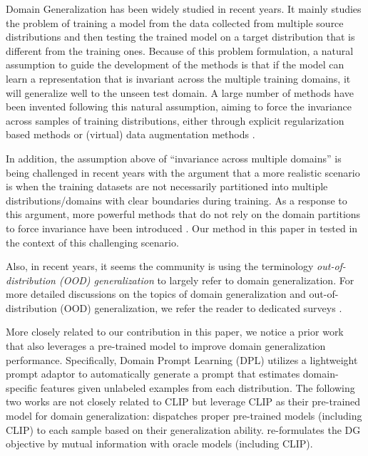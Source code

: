 \documentclass[10pt,twocolumn,letterpaper]{article}
\begin{document}
Domain Generalization \cite{muandet2013domain} has been widely studied in recent years.
It mainly studies the problem of training a model from the data collected from multiple 
source distributions and then testing the trained model 
on a target distribution that is different from the training ones. Because of this problem formulation, 
a natural assumption to guide the development of the methods 
is that
if the model can learn a representation that is invariant across the multiple 
training domains, 
it will generalize well to the unseen test domain. 
A large number of methods have been invented
following this natural assumption, 
aiming to force the invariance across samples of training distributions, 
either through explicit regularization based methods \cite{li2018domain,li2018deep,zhao2020domain,wang2016select,motiian2017unified,carlucci2018agnostic,akuzawa2019adversarial,ge2021supervised,nguyen2021domain,rahman2021discriminative,han2021learning,zhu2022localized,ding2022domain,wang2022out,wu2022siamdoge,meng2022attention,lee2022cross,zhang2022mvdg,yao2022pcl,huang2020improving,wang2022toward}
or (virtual) data augmentation methods \cite{shankar2018generalizing,yue2019domain,gong2019dlow,zhou2020deep,huang2021fsdr,wang2022domain}. 



In addition, 
the assumption above of ``invariance across multiple domains''
is being challenged in recent years 
with the argument that 
a more realistic scenario is when the training datasets are not necessarily 
partitioned into multiple distributions/domains with clear boundaries
during training. 
As a response to this argument, 
more powerful methods that do not rely on the domain partitions to force invariance
have been introduced
\cite{wang2020self,tian2022neuron,huang2022two}.
Our method in this paper in tested in the context of 
this challenging scenario. 

Also, in recent years, 
it seems the community is using the terminology 
\emph{out-of-distribution (OOD) generalization}
to largely refer to domain generalization. 
For more detailed discussions 
on the topics of domain generalization 
and out-of-distribution (OOD) generalization, 
we refer the reader to dedicated surveys
\cite{wang2022generalizing,shen2021towards}.

More closely related to our contribution in this paper, 
we notice a prior work that also leverages a pre-trained model to improve domain generalization performance.  Specifically, Domain Prompt Learning (DPL) \cite{zhang2021domain} utilizes a lightweight prompt adaptor to automatically generate a prompt that estimates domain-specific features given unlabeled examples from each distribution.
The following two works are not closely related to CLIP but leverage CLIP as their pre-trained model for domain generalization: \cite{li2022domain} dispatches proper pre-trained models (including CLIP) to each sample based on their generalization ability. \cite{cha2022domain} re-formulates the DG objective by mutual information with oracle models (including CLIP).
\end{document}
